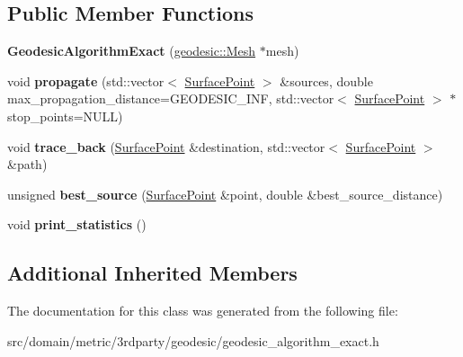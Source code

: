 \subsection*{Public Member Functions}
\begin{DoxyCompactItemize}
\item 
\hypertarget{classgeodesic_1_1_geodesic_algorithm_exact_abaceb49432858b68f283c68b125ca7c0}{}{\bfseries Geodesic\+Algorithm\+Exact} (\hyperlink{classgeodesic_1_1_mesh}{geodesic\+::\+Mesh} $\ast$mesh)\label{classgeodesic_1_1_geodesic_algorithm_exact_abaceb49432858b68f283c68b125ca7c0}

\item 
\hypertarget{classgeodesic_1_1_geodesic_algorithm_exact_afc03c949d24c426e64b30c129715a9bf}{}void {\bfseries propagate} (std\+::vector$<$ \hyperlink{classgeodesic_1_1_surface_point}{Surface\+Point} $>$ \&sources, double max\+\_\+propagation\+\_\+distance=G\+E\+O\+D\+E\+S\+I\+C\+\_\+\+I\+N\+F, std\+::vector$<$ \hyperlink{classgeodesic_1_1_surface_point}{Surface\+Point} $>$ $\ast$stop\+\_\+points=N\+U\+L\+L)\label{classgeodesic_1_1_geodesic_algorithm_exact_afc03c949d24c426e64b30c129715a9bf}

\item 
\hypertarget{classgeodesic_1_1_geodesic_algorithm_exact_a7e261114191fec49e7ae32b8ed53ab21}{}void {\bfseries trace\+\_\+back} (\hyperlink{classgeodesic_1_1_surface_point}{Surface\+Point} \&destination, std\+::vector$<$ \hyperlink{classgeodesic_1_1_surface_point}{Surface\+Point} $>$ \&path)\label{classgeodesic_1_1_geodesic_algorithm_exact_a7e261114191fec49e7ae32b8ed53ab21}

\item 
\hypertarget{classgeodesic_1_1_geodesic_algorithm_exact_a626ac6ed0df6ca0eb8a846659b8dff9b}{}unsigned {\bfseries best\+\_\+source} (\hyperlink{classgeodesic_1_1_surface_point}{Surface\+Point} \&point, double \&best\+\_\+source\+\_\+distance)\label{classgeodesic_1_1_geodesic_algorithm_exact_a626ac6ed0df6ca0eb8a846659b8dff9b}

\item 
\hypertarget{classgeodesic_1_1_geodesic_algorithm_exact_a9ddc832bfa35517cc235180debab3c4d}{}void {\bfseries print\+\_\+statistics} ()\label{classgeodesic_1_1_geodesic_algorithm_exact_a9ddc832bfa35517cc235180debab3c4d}

\end{DoxyCompactItemize}
\subsection*{Additional Inherited Members}


The documentation for this class was generated from the following file\+:\begin{DoxyCompactItemize}
\item 
src/domain/metric/3rdparty/geodesic/geodesic\+\_\+algorithm\+\_\+exact.\+h\end{DoxyCompactItemize}
